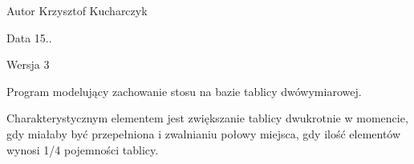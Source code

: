 \begin{DoxyAuthor}{\-Autor}
\-Krzysztof \-Kucharczyk 
\end{DoxyAuthor}
\begin{DoxyDate}{\-Data}
15.. 
\end{DoxyDate}
\begin{DoxyVersion}{\-Wersja}
3
\end{DoxyVersion}
\-Program modelujący zachowanie stosu na bazie tablicy dwówymiarowej.

\-Charakterystycznym elementem jest zwiększanie tablicy dwukrotnie w momencie, gdy miałaby być przepełniona i zwalnianiu połowy miejsca, gdy ilość elementów wynosi 1/4 pojemności tablicy. 